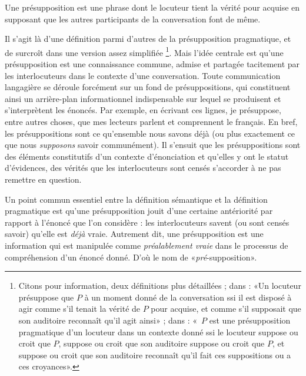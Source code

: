 \begin{refsegment}
\begin{defi}
Une présupposition est une phrase dont le locuteur tient la vérité pour acquise en supposant que les autres participants de la conversation font de même.
\end{defi}

Il s'agit là d'une définition parmi d'autres de la présupposition pragmatique, et de surcroît dans une version assez simplifiée%
\footnote{Citons pour information, deux définitions plus détaillées ; 
dans \citet[448]{Stlnk:73} :
«Un locuteur présuppose que $P$ 
à un moment donné de la conversation
ssi
il est disposé à agir comme s'il tenait la vérité de
$P$ pour acquise, et comme s'il supposait que son auditoire reconnaît
qu'il agit ainsi»{} ; dans \citet[200]{Stlnk:74} :
«~$P$ est une 
présupposition pragmatique d'un locuteur
dans un contexte donné ssi le locuteur suppose ou croit que $P$,
suppose ou croit que son auditoire suppose ou croit que $P$, et
suppose ou croit que son auditoire reconnaît qu'il fait ces
suppositions ou a ces croyances».
}.  
Mais l'idée centrale est qu'une présupposition est une connaissance commune, admise  et partagée tacitement par les interlocuteurs dans le contexte d'une conversation. 
Toute communication langagière se déroule forcément sur un fond de présuppositions, qui constituent ainsi un arrière-plan informationnel indispensable sur lequel se produisent et s'interprètent les énoncés.  Par exemple, en écrivant ces lignes, je présuppose, entre autres choses, que mes lecteurs parlent et comprennent le français. 
En bref, les présuppositions sont ce qu'ensemble nous savons déjà (ou plus exactement ce que nous \emph{supposons} savoir communément). Il s'ensuit que les présuppositions sont des éléments constitutifs d'un contexte d'énonciation et qu'elles y ont le statut d'évidences, des vérités que les interlocuteurs sont censés s'accorder à ne pas remettre en question. 

Un point commun essentiel entre la définition sémantique et la définition pragmatique est qu'une présupposition jouit d'une certaine antériorité par rapport à l'énoncé que l'on considère : les interlocuteurs savent (ou sont censés savoir) qu'elle est \emph{déjà} vraie.  Autrement dit, une présupposition est une information qui est manipulée comme \emph{préalablement vraie} dans le processus de compréhension d'un énoncé donné.  D'où le nom de «\emph{pré}-supposition».



\end{refsegment}
